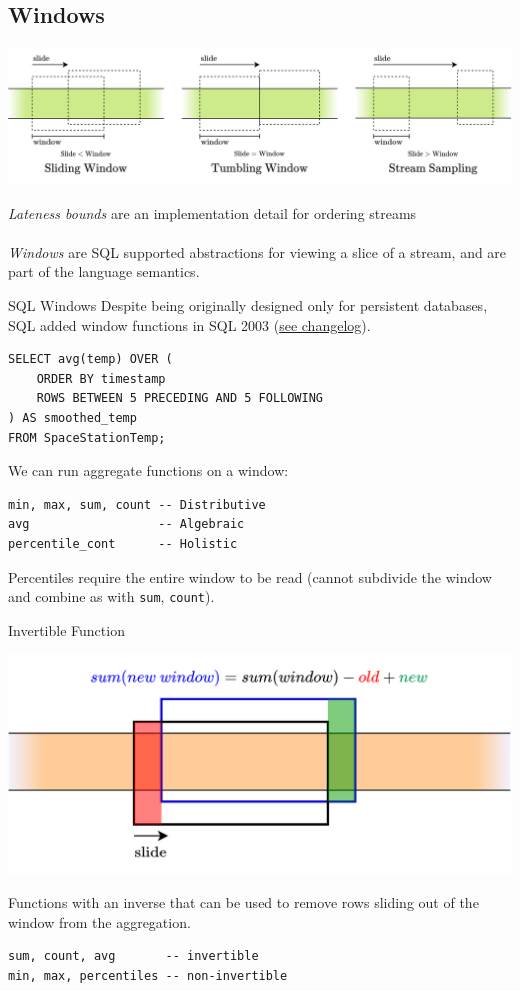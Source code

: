 \subsection{Windows}
\begin{center}
    \includegraphics[width=.9\textwidth]{streams/images/window_types.drawio.png}
\end{center}
\textit{Lateness bounds} are an implementation detail for ordering streams
\\ 
\\ \textit{Windows} are SQL supported abstractions for viewing a slice of a stream, and are part of the language semantics.
\begin{sidenotebox}{SQL Windows}
    Despite being originally designed only for persistent databases, SQL added window functions in SQL 2003 (\href{https://en.wikipedia.org/wiki/SQL:2003}{see changelog}).
\end{sidenotebox}
\begin{verbatim}
SELECT avg(temp) OVER (
    ORDER BY timestamp
    ROWS BETWEEN 5 PRECEDING AND 5 FOLLOWING
) AS smoothed_temp
FROM SpaceStationTemp;
\end{verbatim}
We can run aggregate functions on a window:
\begin{verbatim}
min, max, sum, count -- Distributive
avg                  -- Algebraic
percentile_cont      -- Holistic
\end{verbatim}
Percentiles require the entire window to be read (cannot subdivide the window and combine as with \texttt{sum}, \texttt{count}).
\begin{definitionbox}{Invertible Function}
    \begin{center}
        \includegraphics[width=.7\textwidth]{streams/images/invertible_agreggate.drawio.png}
    \end{center}
    Functions with an inverse that can be used to remove rows sliding out of the window from the aggregation.
    \begin{verbatim}
sum, count, avg       -- invertible
min, max, percentiles -- non-invertible
    \end{verbatim}
\end{definitionbox}

